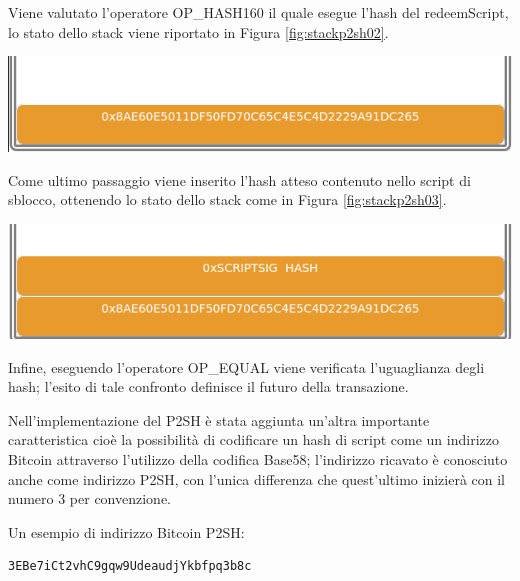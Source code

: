 Viene valutato l’operatore OP\_HASH160 il quale esegue l’hash del redeemScript, lo stato dello stack viene riportato in Figura \ref{fig:stackp2sh02}.

{\centering
\vspace{15pt}
\includegraphics[scale=0.35]{images/script/p2sh/2.png}
\vspace{10pt}
\par}

Come ultimo passaggio viene inserito l’hash atteso contenuto nello script di sblocco, ottenendo lo stato dello stack come in Figura \ref{fig:stackp2sh03}.

{\centering
\vspace{15pt}
\includegraphics[scale=0.35]{images/script/p2sh/3.png}
\vspace{10pt}
\par}

Infine, eseguendo l’operatore OP\_EQUAL viene verificata l’uguaglianza degli hash; l’esito di tale confronto definisce il futuro della transazione.

Nell'implementazione del P2SH è stata aggiunta un’altra importante caratteristica cioè la possibilità di codificare un hash di script come un indirizzo Bitcoin attraverso l’utilizzo della codifica Base58; l’indirizzo ricavato è conosciuto anche come indirizzo P2SH, con l’unica differenza che quest'ultimo inizierà con il numero 3 per convenzione.

Un esempio di indirizzo Bitcoin P2SH:

\begin{lstlisting}[language=bitcoinscript, caption={Indirizzo Bitcoin P2SH.}]
3EBe7iCt2vhC9gqw9UdeaudjYkbfpq3b8c
\end{lstlisting}

